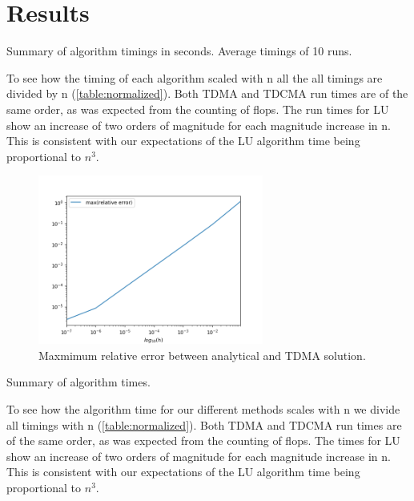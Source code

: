 \section*{Results}

\begin{table}[htp]
  \centering
  \caption{Summary of algorithm timings in seconds. Average timings of 10 runs.}
  \label{table:normalized}
\end{table}




To see how the timing of each algorithm scaled with n all the
all timings are divided by n (\cref{table:normalized}). Both TDMA and
TDCMA run times are of the same order, as was
expected from the counting of flops. The run times for LU show an increase of two
orders of magnitude for each magnitude increase in n. This is consistent with
our expectations of the LU algorithm time being proportional to $n^3$.





\begin{figure}[htp]
  \centering
  \includegraphics[width=0.66\textwidth]{../figures/relative_error.png}
  \caption{Maxmimum relative error between analytical and TDMA solution.}
  \label{fig:a}
\end{figure}




\begin{table}[htp]
  \centering
  \caption{Summary of algorithm times.}
  \label{table:summary}
\end{table}


To see how the algorithm time for our different methods scales with n we divide
all timings with n (\cref{table:normalized}). Both TDMA and TDCMA run times
are of the same order, as was expected from
the counting of flops. The times for LU show an increase of two orders of magnitude
for each magnitude increase in n. This is consistent with our expectations
of the LU algorithm time being proportional to $n^3$.

